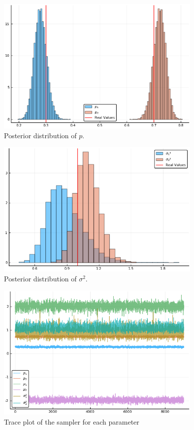 \documentclass[12pt,letterpaper]{article}
\begin{document}
\begin{enumerate}[leftmargin=!,labelindent=5pt]
\begin{figure}[H]
    \centering
    \includegraphics[width=10cm]{images/Ex8_2.png}
    \caption{Posterior distribution of $p$.
    }
    \label{fig:3}
\end{figure}
\begin{figure}[H]
    \centering
    \includegraphics[width=10cm]{images/Ex8_3.png}
    \caption{Posterior distribution of $\sigma^2$.
    }
    \label{fig:4}
\end{figure}
\begin{figure}[H]
    \centering
    \includegraphics[width=10cm]{images/Ex8_4.png}
    \caption{Trace plot of the sampler for each parameter
    }
    \label{fig:4}
\end{figure}

\end{enumerate}
\end{document}
